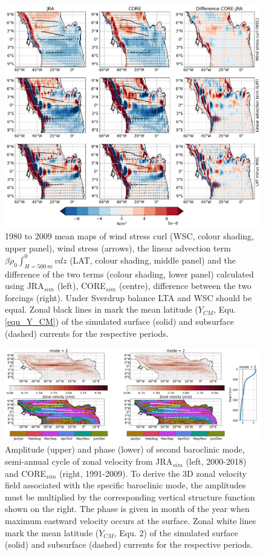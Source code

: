 \documentclass[os, manuscript]{copernicus}
\begin{document}
	\clearpage
	\begin{figure}[t]
		\includegraphics[width=12cm]{../../figures/paper/fA1_INALT20_linear_advection_maps_mean_1980_2009.png}
		\caption{1980 to 2009 mean maps of wind stress curl (WSC, colour shading, upper panel), wind stress (arrows), the linear advection term $\beta \rho_0 \int_{H=500\,m}^{0} v dz$ (LAT, colour shading, middle panel) and the difference of the two terms (colour shading, lower panel) calculated using JRA$_{sim}$ (left), CORE$_{sim}$ (centre), difference between the two forcings (right). Under Sverdrup balance LTA and WSC should be equal. Zonal black lines in mark the mean latitude ($ Y_{CM} $, Equ. \ref{equ_Y_CM}) of the simulated surface (solid) and subsurface (dashed) currents for the respective periods.}
		\label{fig_lin_adv_term}
	\end{figure}
	\clearpage
	\begin{figure}[t]
		\includegraphics[width=12cm]{../../figures/paper/fA2_INALT20_SH_MODE2.png}
		\caption{Amplitude (upper) and phase (lower) of second baroclinic mode, semi-annual cycle of zonal velocity from JRA$_{sim}$ (left, 2000-2018) and CORE$_{sim}$ (right, 1991-2009). To derive the 3D zonal velocity field associated with the specific baroclinic mode, the amplitudes must be multiplied by the corresponding vertical structure function shown on the right. The phase is given in month of the year when maximum eastward velocity occurs at the surface. Zonal white lines mark the mean latitude ($ Y_{CM} $, Equ. 2) of the simulated surface (solid) and subsurface (dashed) currents for the respective periods.}
		\label{fig_MODE2_SH}
	\end{figure}
\end{document}
